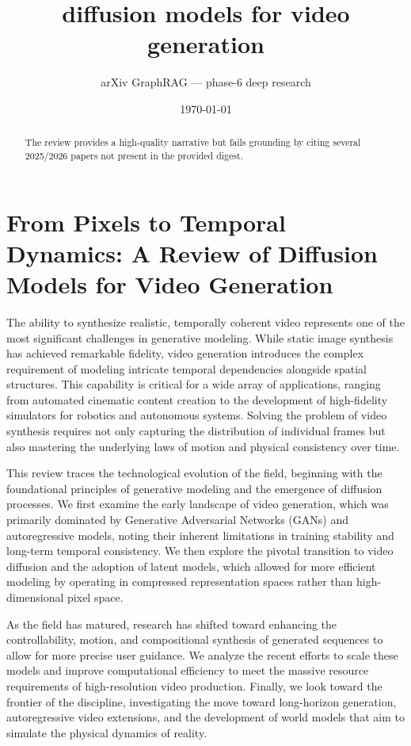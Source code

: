 \documentclass[11pt]{article}
\title{diffusion models for video generation}
\author{arXiv GraphRAG --- phase-6 deep research}
\date{\today}
\begin{document}
\maketitle

\begin{abstract}
The review provides a high-quality narrative but fails grounding by citing several 2025/2026 papers not present in the provided digest.
\end{abstract}

\section{From Pixels to Temporal Dynamics: A Review of Diffusion Models for Video Generation}

The ability to synthesize realistic, temporally coherent video represents one of the most significant challenges in generative modeling. While static image synthesis has achieved remarkable fidelity, video generation introduces the complex requirement of modeling intricate temporal dependencies alongside spatial structures. This capability is critical for a wide array of applications, ranging from automated cinematic content creation to the development of high-fidelity simulators for robotics and autonomous systems. Solving the problem of video synthesis requires not only capturing the distribution of individual frames but also mastering the underlying laws of motion and physical consistency over time.

This review traces the technological evolution of the field, beginning with the foundational principles of generative modeling and the emergence of diffusion processes. We first examine the early landscape of video generation, which was primarily dominated by Generative Adversarial Networks (GANs) and autoregressive models, noting their inherent limitations in training stability and long-term temporal consistency. We then explore the pivotal transition to video diffusion and the adoption of latent models, which allowed for more efficient modeling by operating in compressed representation spaces rather than high-dimensional pixel space.

As the field has matured, research has shifted toward enhancing the controllability, motion, and compositional synthesis of generated sequences to allow for more precise user guidance. We analyze the recent efforts to scale these models and improve computational efficiency to meet the massive resource requirements of high-resolution video production. Finally, we look toward the frontier of the discipline, investigating the move toward long-horizon generation, autoregressive video extensions, and the development of world models that aim to simulate the physical dynamics of reality.
\end{document}
